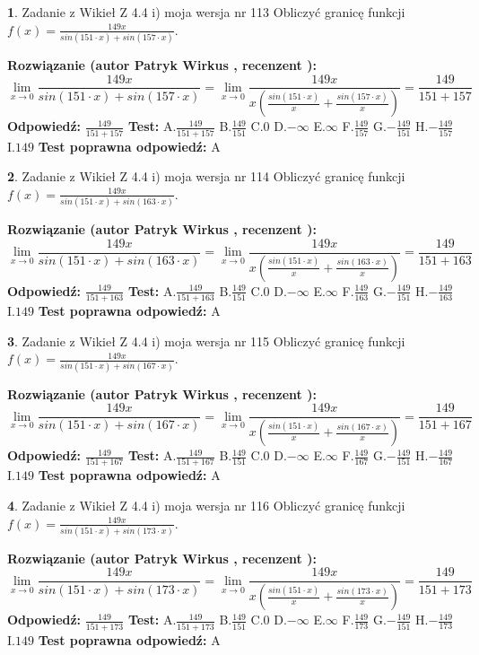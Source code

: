 \documentclass[12pt, a4paper]{article}
\theoremstyle{definition} %
\newtheorem{zad}{}
\newcommand{\zadStart}[1]{\begin{zad}#1\newline}
\newcommand{\zadStop}{\end{zad}}
\newcommand{\rozwStart}[2]{\noindent \textbf{Rozwiązanie (autor #1 , recenzent #2): }\newline}
\newcommand{\rozwStop}{\newline}
\newcommand{\odpStart}{\noindent \textbf{Odpowiedź:}\newline}
\newcommand{\odpStop}{\newline}
\newcommand{\testStart}{\noindent \textbf{Test:}\newline}
\newcommand{\testStop}{\newline}
\newcommand{\kluczStart}{\noindent \textbf{Test poprawna odpowiedź:}\newline}
\newcommand{\kluczStop}{\newline}
\begin{document}
\zadStart{Zadanie z Wikieł Z 4.4 i) moja wersja nr 113}
Obliczyć granicę funkcji $f(x)=\frac{149x}{sin(151\cdot x) +sin(157\cdot x)}$.
\zadStop
\rozwStart{Patryk Wirkus}{}
$$\lim\limits_{x\to 0}\frac{149x}{sin(151\cdot x) +sin(157\cdot x)}=\lim\limits_{x\to 0}\frac{149x}{x(\frac{sin(151\cdot x)}{x}+\frac{sin(157\cdot x)}{x})}=\frac{149}{151+157}$$
\rozwStop
\odpStart
$\frac{149}{151+157}$
\odpStop
\testStart
A.$\frac{149}{151+157}$
B.$\frac{149}{151}$
C.$0$
D.$-\infty$
E.$\infty$
F.$\frac{149}{157}$
G.$-\frac{149}{151}$
H.$-\frac{149}{157}$
I.$149$
\testStop
\kluczStart
A
\kluczStop



\zadStart{Zadanie z Wikieł Z 4.4 i) moja wersja nr 114}
Obliczyć granicę funkcji $f(x)=\frac{149x}{sin(151\cdot x) +sin(163\cdot x)}$.
\zadStop
\rozwStart{Patryk Wirkus}{}
$$\lim\limits_{x\to 0}\frac{149x}{sin(151\cdot x) +sin(163\cdot x)}=\lim\limits_{x\to 0}\frac{149x}{x(\frac{sin(151\cdot x)}{x}+\frac{sin(163\cdot x)}{x})}=\frac{149}{151+163}$$
\rozwStop
\odpStart
$\frac{149}{151+163}$
\odpStop
\testStart
A.$\frac{149}{151+163}$
B.$\frac{149}{151}$
C.$0$
D.$-\infty$
E.$\infty$
F.$\frac{149}{163}$
G.$-\frac{149}{151}$
H.$-\frac{149}{163}$
I.$149$
\testStop
\kluczStart
A
\kluczStop



\zadStart{Zadanie z Wikieł Z 4.4 i) moja wersja nr 115}
Obliczyć granicę funkcji $f(x)=\frac{149x}{sin(151\cdot x) +sin(167\cdot x)}$.
\zadStop
\rozwStart{Patryk Wirkus}{}
$$\lim\limits_{x\to 0}\frac{149x}{sin(151\cdot x) +sin(167\cdot x)}=\lim\limits_{x\to 0}\frac{149x}{x(\frac{sin(151\cdot x)}{x}+\frac{sin(167\cdot x)}{x})}=\frac{149}{151+167}$$
\rozwStop
\odpStart
$\frac{149}{151+167}$
\odpStop
\testStart
A.$\frac{149}{151+167}$
B.$\frac{149}{151}$
C.$0$
D.$-\infty$
E.$\infty$
F.$\frac{149}{167}$
G.$-\frac{149}{151}$
H.$-\frac{149}{167}$
I.$149$
\testStop
\kluczStart
A
\kluczStop



\zadStart{Zadanie z Wikieł Z 4.4 i) moja wersja nr 116}
Obliczyć granicę funkcji $f(x)=\frac{149x}{sin(151\cdot x) +sin(173\cdot x)}$.
\zadStop
\rozwStart{Patryk Wirkus}{}
$$\lim\limits_{x\to 0}\frac{149x}{sin(151\cdot x) +sin(173\cdot x)}=\lim\limits_{x\to 0}\frac{149x}{x(\frac{sin(151\cdot x)}{x}+\frac{sin(173\cdot x)}{x})}=\frac{149}{151+173}$$
\rozwStop
\odpStart
$\frac{149}{151+173}$
\odpStop
\testStart
A.$\frac{149}{151+173}$
B.$\frac{149}{151}$
C.$0$
D.$-\infty$
E.$\infty$
F.$\frac{149}{173}$
G.$-\frac{149}{151}$
H.$-\frac{149}{173}$
I.$149$
\testStop
\kluczStart
A
\kluczStop
\end{document}
